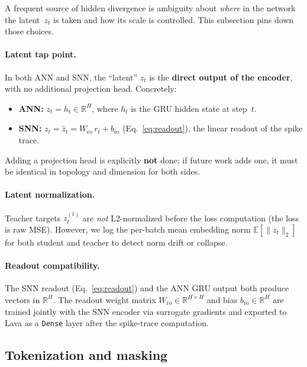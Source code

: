 \documentclass[11pt,a4paper]{article}
\begin{document}
A frequent source of hidden divergence is ambiguity about \emph{where} in
the network the latent~$z_t$ is taken and how its scale is controlled.
This subsection pins down those choices.

\paragraph{Latent tap point.}
In both ANN and SNN, the ``latent'' $z_t$ is the \textbf{direct output of
the encoder}, with no additional projection head.  Concretely:
\begin{itemize}[nosep]
\item \textbf{ANN:} $z_t = h_t \in \mathbb{R}^H$, where $h_t$ is the
  GRU hidden state at step~$t$.
\item \textbf{SNN:} $z_t = \hat{z}_t = W_{\text{ro}}\,r_t +
  b_{\text{ro}}$ (Eq.~\ref{eq:readout}), the linear readout of the
  spike trace.
\end{itemize}
Adding a projection head is explicitly \textbf{not} done; if future work
adds one, it must be identical in topology and dimension for both sides.

\paragraph{Latent normalization.}
Teacher targets $z_t^{(t)}$ are \emph{not} L2-normalized before the loss
computation (the loss is raw MSE).  However, we log the per-batch mean
embedding norm $\mathbb{E}[\lVert z_t \rVert_2]$ for both student and
teacher to detect norm drift or collapse.

\paragraph{Readout compatibility.}
The SNN readout (Eq.~\ref{eq:readout}) and the ANN GRU output both
produce vectors in $\mathbb{R}^H$.  The readout weight matrix
$W_{\text{ro}} \in \mathbb{R}^{H\times H}$ and bias
$b_{\text{ro}} \in \mathbb{R}^H$ are trained jointly with the SNN
encoder via surrogate gradients and exported to Lava as a
\texttt{Dense} layer after the spike-trace computation.

\subsection{Tokenization and masking}\label{sec:tokens}
\end{document}

